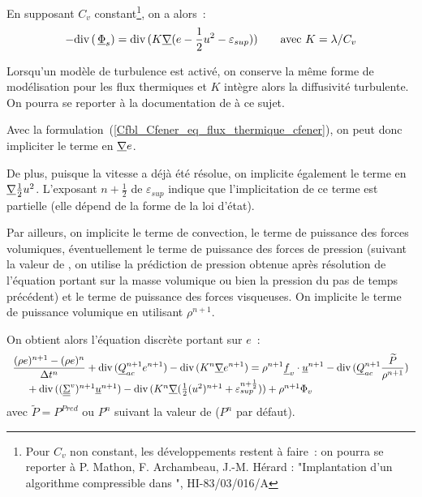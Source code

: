 En supposant $C_v$ constant\footnote{Pour $C_v$ non constant, les
d\'eveloppements restent \`a faire~: on pourra se
reporter \`a  P. Mathon, F. Archambeau, J.-M. Hérard : "Implantation d'un
algorithme compressible dans \CS", HI-83/03/016/A}, on a alors~:
\begin{equation}\label{Cfbl_Cfener_eq_flux_thermique_cfener}
-\text{div}\,(\,\underline{\Phi}_s)
= \text{div}\,(K \underline{\nabla}(e - \frac{1}{2} u^2 - \varepsilon_{sup}))\qquad
\text{avec } K=\lambda / C_v
\end{equation}

Lorsqu'un mod\`ele de turbulence est activ\'e, on conserve la m\^eme forme
de mod\'elisation pour les flux thermiques et $K$ int\`egre alors
la diffusivit\'e turbulente. On pourra se reporter \`a
la documentation de  \`a ce sujet.

Avec la formulation~(\ref{Cfbl_Cfener_eq_flux_thermique_cfener}),
on peut donc impliciter le terme en $\underline{\nabla}{e}$.

\bigskip
De plus, puisque la vitesse a
d\'ej\`a \'et\'e r\'esolue, on implicite \'egalement le terme en
$\underline{\nabla}{\frac{1}{2} u^2}$. L'exposant $n+\frac{1}{2}$ de $\varepsilon_{sup}$
indique que l'implicitation de ce terme est partielle (elle d\'epend de la forme
de la loi d'\'etat).

Par ailleurs, on implicite le terme de convection, le terme de puissance
des forces volumiques, éventuellement le terme de puissance des forces de
pression (suivant la valeur de , on utilise la pr\'ediction de
pression obtenue apr\`es r\'esolution de l'\'equation portant sur la masse
volumique ou bien la pression du pas de temps précédent)
et le terme de puissance des forces visqueuses. On implicite le terme de puissance
volumique en utilisant $\rho^{n+1}$.

\bigskip
On obtient alors l'\'equation discr\`ete portant sur $e$~:
\begin{equation}\label{Cfbl_Cfener_eq_energie_totale_cfener}
\begin{array}{l}
\displaystyle\frac{(\rho e)^{n+1} - (\rho e)^n}{\Delta t^n}
+ \text{div}\,(\underline{Q}_{ac}^{n+1} e^{n+1}) - \text{div}\,(K^n \underline{\nabla}{e^{n+1}})
= \rho^{n+1} \underline{f}_v \cdot \underline{u}^{n+1}
- \text{div}\,(\underline{Q}_{ac}^{n+1} \displaystyle\frac{\widetilde{P}}{\rho^{n+1}} )\\
\text{\ \ \ \ }+ \text{div}\,((\underline{\underline{\Sigma}}^v)^{n+1} \underline{u}^{n+1})
- \text{div}\,(K^n \underline{\nabla}(\frac{1}{2} (u^2)^{n+1}
+ \varepsilon_{sup}^{n+\frac{1}{2}}))
+ \rho^{n+1}\Phi_v\\
\end{array}
\end{equation}
avec $\widetilde{P}=P^{Pred}\text{ ou }P^n$ suivant la valeur de 
($P^n$ par défaut).

